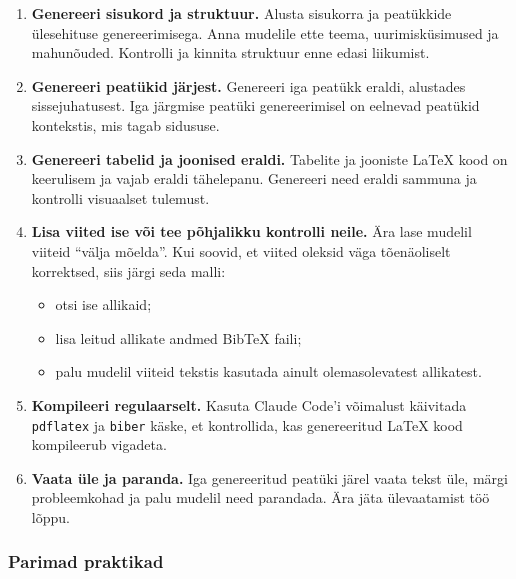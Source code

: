 \begin{enumerate}
    \item \textbf{Genereeri sisukord ja struktuur.} Alusta sisukorra ja peatükkide ülesehituse genereerimisega. Anna mudelile ette teema, uurimisküsimused ja mahunõuded. Kontrolli ja kinnita struktuur enne edasi liikumist.
    \item \textbf{Genereeri peatükid järjest.} Genereeri iga peatükk eraldi, alustades sissejuhatusest. Iga järgmise peatüki genereerimisel on eelnevad peatükid kontekstis, mis tagab sidususe.
    \item \textbf{Genereeri tabelid ja joonised eraldi.} Tabelite ja jooniste \LaTeX{} kood on keerulisem ja vajab eraldi tähelepanu. Genereeri need eraldi sammuna ja kontrolli visuaalset tulemust.
    \item \textbf{Lisa viited ise või tee põhjalikku kontrolli neile.} Ära lase mudelil viiteid ``välja mõelda''. Kui soovid, et viited oleksid väga tõenäoliselt korrektsed, siis järgi seda malli:
    \begin{itemize}
        \item otsi ise allikaid;
        \item lisa leitud allikate andmed BibTeX faili;
        \item palu mudelil viiteid tekstis kasutada ainult olemasolevatest allikatest.
    \end{itemize}
    \item \textbf{Kompileeri regulaarselt.} Kasuta Claude Code'i võimalust käivitada \texttt{pdflatex} ja \texttt{biber} käske, et kontrollida, kas genereeritud \LaTeX{} kood kompileerub vigadeta.
    \item \textbf{Vaata üle ja paranda.} Iga genereeritud peatüki järel vaata tekst üle, märgi probleemkohad ja palu mudelil need parandada. Ära jäta ülevaatamist töö lõppu.
\end{enumerate}

\subsubsection{Parimad praktikad}

